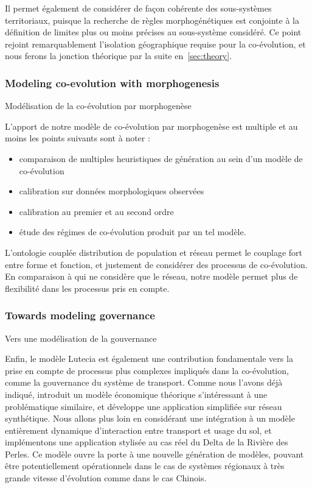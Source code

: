 Il permet également de considérer de façon cohérente des sous-systèmes territoriaux, puisque la recherche de règles morphogénétiques est conjointe à la définition de limites plus ou moins précises au sous-système considéré. Ce point rejoint remarquablement l'isolation géographique requise pour la co-évolution, et nous ferons la jonction théorique par la suite en~\ref{sec:theory}.



\subsubsection{Modeling co-evolution with morphogenesis}{Modélisation de la co-évolution par morphogenèse}


L'apport de notre modèle de co-évolution par morphogenèse est multiple et au moins les points suivants sont à noter :
\begin{itemize}
	\item comparaison de multiples heuristiques de génération au sein d'un modèle de co-évolution
	\item calibration sur données morphologiques observées
	\item calibration au premier et au second ordre
	\item étude des régimes de co-évolution produit par un tel modèle.
\end{itemize}

L'ontologie couplée distribution de population et réseau permet le couplage fort entre forme et fonction, et justement de considérer des processus de co-évolution. En comparaison à \cite{barthelemy2009co} qui ne considère que le réseau, notre modèle permet plus de flexibilité dans les processus pris en compte.

\subsubsection{Towards modeling governance}{Vers une modélisation de la gouvernance}


Enfin, le modèle Lutecia est également une contribution fondamentale vers la prise en compte de processus plus complexes impliqués dans la co-évolution, comme la gouvernance du système de transport. Comme nous l'avons déjà indiqué, \cite{Xie2011} introduit un modèle économique théorique s'intéressant à une problématique similaire, et \cite{xie2011governance} développe une application simplifiée sur réseau synthétique. Nous allons plus loin en considérant une intégration à un modèle entièrement dynamique d'interaction entre transport et usage du sol, et implémentons une application stylisée au cas réel du Delta de la Rivière des Perles. Ce modèle ouvre la porte à une nouvelle génération de modèles, pouvant être potentiellement opérationnels dans le cas de systèmes régionaux à très grande vitesse d'évolution comme dans le cas Chinois.



